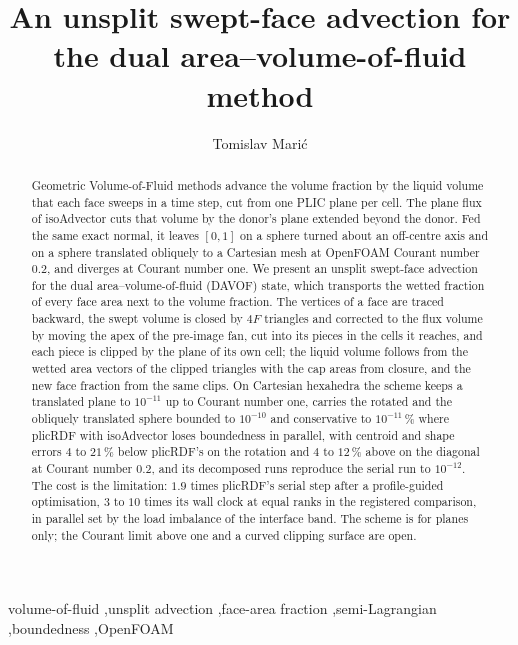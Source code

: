 \documentclass[preprint,12pt]{elsarticle}
\begin{document}
\frenchspacing

\begin{frontmatter}

\title{An unsplit swept-face advection for the dual area--volume-of-fluid method}

\author[mma]{Tomislav Mari\'{c}}
\address[mma]{Mathematical Modeling and Analysis, Department of Mathematics, Technical University of Darmstadt, Peter-Gr\"unberg-Stra{\ss}e 10, 64287 Darmstadt, Germany}

\begin{abstract}
Geometric Volume-of-Fluid methods advance the volume fraction by the liquid volume that each face sweeps in a time step, cut from one PLIC plane per cell. The plane flux of isoAdvector cuts that volume by the donor's plane extended beyond the donor. Fed the same exact normal, it leaves $[0, 1]$ on a sphere turned about an off-centre axis and on a sphere translated obliquely to a Cartesian mesh at OpenFOAM Courant number $0.2$, and diverges at Courant number one. We present an unsplit swept-face advection for the dual area--volume-of-fluid (DAVOF) state, which transports the wetted fraction of every face area next to the volume fraction. The vertices of a face are traced backward, the swept volume is closed by $4F$ triangles and corrected to the flux volume by moving the apex of the pre-image fan, cut into its pieces in the cells it reaches, and each piece is clipped by the plane of its own cell; the liquid volume follows from the wetted area vectors of the clipped triangles with the cap areas from closure, and the new face fraction from the same clips. On Cartesian hexahedra the scheme keeps a translated plane to $10^{-11}$ up to Courant number one, carries the rotated and the obliquely translated sphere bounded to $10^{-10}$ and conservative to $10^{-11}\,\%$ where plicRDF with isoAdvector loses boundedness in parallel, with centroid and shape errors $4$ to $21\,\%$ below plicRDF's on the rotation and $4$ to $12\,\%$ above on the diagonal at Courant number $0.2$, and its decomposed runs reproduce the serial run to $10^{-12}$. The cost is the limitation: $1.9$ times plicRDF's serial step after a profile-guided optimisation, $3$ to $10$ times its wall clock at equal ranks in the registered comparison, in parallel set by the load imbalance of the interface band. The scheme is for planes only; the Courant limit above one and a curved clipping surface are open.
\end{abstract}

\begin{keyword}
volume-of-fluid \sep unsplit advection \sep face-area fraction \sep semi-Lagrangian \sep boundedness \sep OpenFOAM
\end{keyword}

\end{frontmatter}
\end{document}
